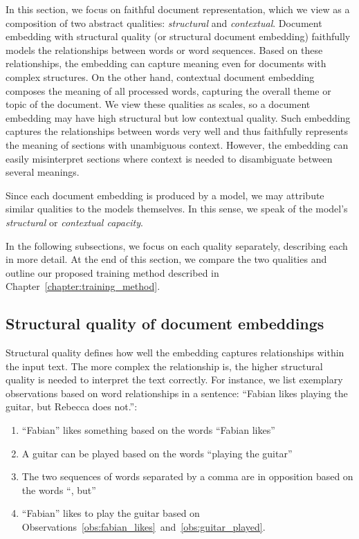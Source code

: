 In this section, we focus on faithful document representation, which we view as
a composition of two abstract qualities: \emph{structural} and
\emph{contextual}. Document embedding with structural quality (or structural
document embedding) faithfully models the relationships between words or word
sequences. Based on these relationships, the embedding can capture meaning even
for documents with complex structures. On the other hand, contextual document
embedding composes the meaning of all processed words, capturing the overall
theme or topic of the document. We view these qualities as scales, so a
document embedding may have high structural but low contextual quality.
Such embedding captures the relationships between words very well and thus
faithfully represents the meaning of sections with unambiguous context.
However, the embedding can easily misinterpret sections where context is
needed to disambiguate between several meanings.

Since each document embedding is produced by a model, we may attribute similar
qualities to the models themselves. In this sense, we speak of the model's
\emph{structural} or \emph{contextual capacity}.

In the following subsections, we focus on each quality separately, describing
each in more detail. At the end of this section, we compare the two
qualities and outline our proposed training method described in
Chapter~\ref{chapter:training_method}.

\subsection{Structural quality of document embeddings}

Structural quality defines how well the embedding captures relationships within
the input text. The more complex the relationship is, the higher structural
quality is needed to interpret the text correctly. For instance, we list
exemplary observations based on word relationships in a sentence: ``Fabian
likes playing the guitar, but Rebecca does not.'':

\begin{enumerate}[label={Observation \arabic*.},ref=\arabic*,wide=0pt]

  \item ``Fabian'' likes something based on the words ``Fabian likes''
    \label{obs:fabian_likes}

  \item A guitar can be played based on the words ``playing the guitar''
    \label{obs:guitar_played}

  \item The two sequences of words separated by a comma are in opposition based
    on the words ``, but'' \label{obs:opposed_sequences}

  \item ``Fabian'' likes to play the guitar based on
    Observations~\ref{obs:fabian_likes}~and~\ref{obs:guitar_played}.
    \label{obs:structural_complex}

\end{enumerate}


